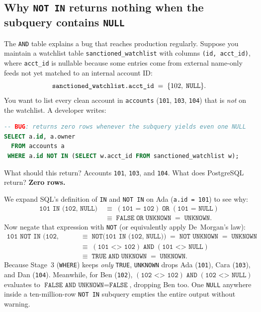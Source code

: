 \subsection{Why \texttt{NOT IN} returns nothing when the subquery contains \texttt{NULL}}

The \texttt{AND} table explains a bug that reaches production regularly. Suppose you maintain a watchlist table \texttt{sanctioned\_watchlist} with columns \texttt{(id, acct\_id)}, where \texttt{acct\_id} is nullable because some entries come from external name-only feeds not yet matched to an internal account ID:
\[
  \texttt{sanctioned\_watchlist.acct\_id} \;=\; \{102,\; \text{\texttt{NULL}}\}.
\]
You want to list every clean account in \texttt{accounts} (\texttt{101}, \texttt{103}, \texttt{104}) that is \emph{not} on the watchlist. A developer writes:

\begin{lstlisting}[language=SQL]
-- BUG: returns zero rows whenever the subquery yields even one NULL
SELECT a.id, a.owner
  FROM accounts a
 WHERE a.id NOT IN (SELECT w.acct_id FROM sanctioned_watchlist w);
\end{lstlisting}

What should this return? Accounts \texttt{101}, \texttt{103}, and \texttt{104}. What does PostgreSQL return? \textbf{Zero rows.}

We expand SQL's definition of \texttt{IN} and \texttt{NOT IN} on Ada (\texttt{a.id = 101}) to see why:
\begin{align*}
  \texttt{101 IN (102, NULL)}
    &\;\equiv\; (\texttt{101 = 102}) \;\texttt{OR}\; (\texttt{101 = NULL}) \\
    &\;\equiv\; \texttt{FALSE} \;\texttt{OR}\; \texttt{UNKNOWN} \;=\; \texttt{UNKNOWN}.
\end{align*}
Now negate that expression with \texttt{NOT} (or equivalently apply De~Morgan's law):
\begin{align*}
  \texttt{101 NOT IN (102, NULL)}
    &\;\equiv\; \texttt{NOT}\bigl(\texttt{101 IN (102, NULL)}\bigr) \;=\; \texttt{NOT UNKNOWN} \;=\; \texttt{UNKNOWN} \\
    &\;\equiv\; (\texttt{101 <> 102}) \;\texttt{AND}\; (\texttt{101 <> NULL}) \\
    &\;\equiv\; \texttt{TRUE} \;\texttt{AND}\; \texttt{UNKNOWN} \;=\; \texttt{UNKNOWN}.
\end{align*}
Because Stage~3 (\texttt{WHERE}) keeps \emph{only} \texttt{TRUE}, \texttt{UNKNOWN} drops Ada (\texttt{101}), Cara (\texttt{103}), and Dan (\texttt{104}). Meanwhile, for Ben (\texttt{102}), $(\texttt{102 <> 102}) \;\texttt{AND}\; (\texttt{102 <> NULL})$ evaluates to $\texttt{FALSE AND UNKNOWN} = \texttt{FALSE}$, dropping Ben too. One \texttt{NULL} anywhere inside a ten-million-row \texttt{NOT IN} subquery empties the entire output without warning.

